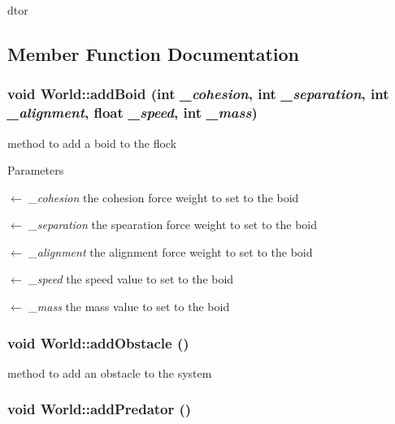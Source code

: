 dtor 

\subsection{Member Function Documentation}
\hypertarget{classWorld_acb5c55c5acba136955f16bc43c8abc97}{
\subsubsection[{addBoid}]{\setlength{\rightskip}{0pt plus 5cm}void World::addBoid (int {\em \_\-cohesion}, \/  int {\em \_\-separation}, \/  int {\em \_\-alignment}, \/  float {\em \_\-speed}, \/  int {\em \_\-mass})}}
\label{classWorld_acb5c55c5acba136955f16bc43c8abc97}


method to add a boid to the flock 
\begin{DoxyParams}{Parameters}
\item[\mbox{$\leftarrow$} {\em \_\-cohesion}]the cohesion force weight to set to the boid \item[\mbox{$\leftarrow$} {\em \_\-separation}]the spearation force weight to set to the boid \item[\mbox{$\leftarrow$} {\em \_\-alignment}]the alignment force weight to set to the boid \item[\mbox{$\leftarrow$} {\em \_\-speed}]the speed value to set to the boid \item[\mbox{$\leftarrow$} {\em \_\-mass}]the mass value to set to the boid \end{DoxyParams}
\hypertarget{classWorld_a03ab08f45d5c960736fe00cc58f9d304}{
\subsubsection[{addObstacle}]{\setlength{\rightskip}{0pt plus 5cm}void World::addObstacle ()}}
\label{classWorld_a03ab08f45d5c960736fe00cc58f9d304}


method to add an obstacle to the system \hypertarget{classWorld_a8b784b631e2e635837ab9d8877881771}{
\subsubsection[{addPredator}]{\setlength{\rightskip}{0pt plus 5cm}void World::addPredator ()}}
\label{classWorld_a8b784b631e2e635837ab9d8877881771}


